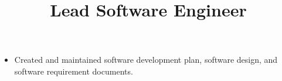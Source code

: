 \documentclass[margin]{res}
\begin{document}
\begin{resume}
\title{\textbf{Lead Software Engineer}}
\begin{position}
\begin{itemize}[noitemsep, topsep=0pt]
\item Created and maintained software development plan, software design, and software requirement documents. 
\end{itemize}
\end{position}

%



\end{resume}
\end{document}
